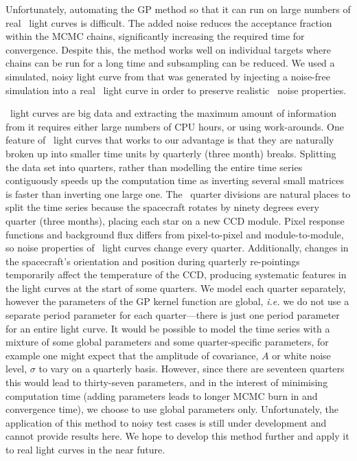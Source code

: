 Unfortunately, automating the GP method so that it can run on large numbers of
real \kepler\ light curves is difficult.
The added noise reduces the acceptance fraction within the MCMC chains,
significantly increasing the required time for convergence.
Despite this, the method works well on individual targets where chains can be
run for a long time and subsampling can be reduced.
We used a simulated, noisy light curve from \citet{Aigrain2015} that was
generated by injecting a noise-free simulation into a real \kepler\ light
curve in order to preserve realistic \kepler\ noise properties.

\kepler\ light curves are big data and extracting the maximum amount of
information from it requires either large numbers of CPU hours, or using
work-arounds.
One feature of \kepler\ light curves that works to our advantage is that they
are naturally broken up into smaller time units by quarterly (three month)
breaks.
Splitting the data set into quarters, rather than modelling the entire time
series contiguously speeds up the computation time as inverting several
small matrices is faster than inverting one large one.
The \kepler\ quarter divisions are natural places to split the time series
because the spacecraft rotates by ninety degrees every quarter (three months),
placing each star on a new CCD module.
Pixel response functions and background flux differs from pixel-to-pixel and
module-to-module, so noise properties of \kepler\ light curves change every
quarter.
Additionally, changes in the spacecraft's orientation and position during
quarterly re-pointings temporarily affect the temperature of the CCD,
producing systematic features in the light curves at the start of some
quarters.
We model each quarter separately, however the parameters of the GP kernel
function are global, {\it i.e.} we do not use a separate period parameter for
each quarter---there is just one period parameter for an entire light curve.
It would be possible to model the time series with a mixture of some global
parameters and some quarter-specific parameters, for example one might expect
that the amplitude of covariance, $A$ or white noise level, $\sigma$ to vary
on a quarterly basis.
However, since there are seventeen quarters this would lead to thirty-seven
parameters, and in the interest of minimising computation time (adding
parameters leads to longer MCMC burn in and convergence time), we choose to
use global parameters only.
Unfortunately, the application of this method to noisy test cases is still
under development and cannot provide results here.
We hope to develop this method further and apply it to real light curves in
the near future.

